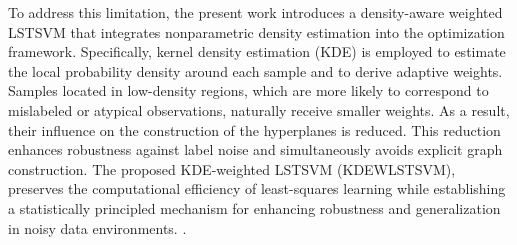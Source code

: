 \documentclass[twoside]{article}
\begin{document}
To address this limitation, the present work introduces a density-aware weighted LSTSVM that integrates nonparametric density estimation into the optimization framework. Specifically, kernel density estimation (KDE) is employed to estimate the local probability density around each sample and to derive adaptive weights. Samples located in low-density regions, which are more likely to correspond to mislabeled or atypical observations, naturally receive smaller weights. As a result, their influence on the construction of the hyperplanes is reduced. This reduction enhances robustness against label noise and simultaneously avoids explicit graph construction. The proposed KDE-weighted LSTSVM (KDEWLSTSVM), preserves the computational efficiency of least-squares learning while establishing a statistically principled mechanism for enhancing robustness and generalization in noisy data environments. \cite{Tanveer2020}.
\end{document}
